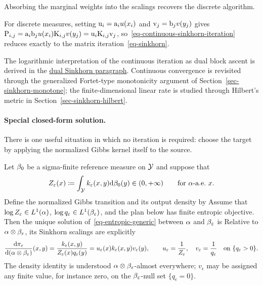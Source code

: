 Absorbing the marginal weights into the scalings recovers the discrete algorithm.
\begin{example}
For discrete measures, setting $\mathrm{u}_i=\mathrm{a}_i u(x_i)$ and $\mathrm{v}_j=\mathrm{b}_j v(y_j)$ gives
\(
	\mathrm{P}_{i,j}=\mathrm{a}_i\mathrm{b}_j u(x_i)\mathrm{K}_{i,j}v(y_j)=\mathrm{u}_i\mathrm{K}_{i,j}\mathrm{v}_j
\),
so~\eqref{eq-continuous-sinkhorn-iteration} reduces exactly to the matrix iteration~\eqref{eq-sinkhorn}.
\end{example}
The logarithmic interpretation of the continuous iteration as dual block ascent is derived in the \hyperref[par-continuous-dual-sinkhorn]{dual Sinkhorn paragraph}. Continuous convergence is revisited through the generalized Fortet-type monotonicity argument of Section~\ref{sec-sinkhorn-monotone}; the finite-dimensional linear rate is studied through Hilbert's metric in Section~\ref{sec-sinkhorn-hilbert}.

\paragraph{Special closed-form solution.}

There is one useful situation in which no iteration is required: choose the target by applying the normalized Gibbs kernel itself to the source.

\begin{prop}\label{prop-sinkhorn-gibbs-pushforward}
Let $\beta_0$ be a sigma-finite reference measure on $\mathcal{Y}$ and suppose that
\[
	Z_\varepsilon(x)\coloneqq\int_{\mathcal{Y}} k_\varepsilon(x,y)\mathrm{d}\beta_0(y)
	\in(0,+\infty)
	\qquad\text{for $\alpha$-a.e.\ }x.
\]
Define the normalized Gibbs transition and its output density by
Assume that $\log Z_\varepsilon\in L^1(\alpha)$, $\log q_\varepsilon\in L^1(\beta_\varepsilon)$, and the plan below has finite entropic objective. Then the unique solution of~\eqref{eq-entropic-generic} between $\alpha$ and $\beta_\varepsilon$ is
Relative to $\alpha\otimes\beta_\varepsilon$, its Sinkhorn scalings are explicitly
\[
	\frac{\mathrm{d}\pi_\varepsilon}{\mathrm{d}(\alpha\otimes\beta_\varepsilon)}(x,y)
	=
	\frac{k_\varepsilon(x,y)}{Z_\varepsilon(x)q_\varepsilon(y)}
	=
	u_\varepsilon(x)k_\varepsilon(x,y)v_\varepsilon(y),
	\qquad
	u_\varepsilon=\frac1{Z_\varepsilon},
	\quad
	v_\varepsilon=\frac1{q_\varepsilon}
	\quad\text{on }\{q_\varepsilon>0\}.
\]
The density identity is understood $\alpha\otimes\beta_\varepsilon$-almost everywhere; $v_\epsilon$ may be assigned any finite value, for instance zero, on the $\beta_\varepsilon$-null set $\{q_\epsilon=0\}$.
\end{prop}

